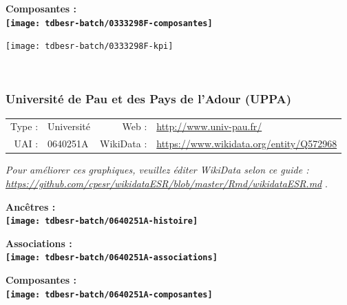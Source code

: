 \documentclass[12pt,french,]{article}
\begin{document}
\hrulefill

\begin{center} \bf Composantes : \\  
\texttt{[image: tdbesr-batch/0333298F-composantes]} \end{center}

\begin{center}\texttt{[image: tdbesr-batch/0333298F-kpi]} \end{center}\checkoddpage

\ifoddpage \fi ~\newpage  

\hypertarget{universituxe9-de-pau-et-des-pays-de-ladour-uppa}{%
\subsubsection{Université de Pau et des Pays de l'Adour
(UPPA)}\label{universituxe9-de-pau-et-des-pays-de-ladour-uppa}}

\begin{tabular*}{\textwidth}{rp{5cm}rl}  
\hline  
Type : & Université & Web : &\href{http://www.univ-pau.fr/}{http://www.univ-pau.fr/} \\  
UAI : & 0640251A & WikiData : & \href{https://www.wikidata.org/entity/Q572968}{https://www.wikidata.org/entity/Q572968} \\  
\hline  
\end{tabular*}

\textit{\scriptsize Pour améliorer ces graphiques, veuillez éditer WikiData selon ce guide :  \href{https://github.com/cpesr/wikidataESR/blob/master/Rmd/wikidataESR.md}{https://github.com/cpesr/wikidataESR/blob/master/Rmd/wikidataESR.md}}
.

\vspace{1cm}  
\begin{minipage}[b]{0.50\textwidth}\begin{center} \bf Ancêtres : \\  
\texttt{[image: tdbesr-batch/0640251A-histoire]} \end{center}\end{minipage}\begin{minipage}[b]{0.50\textwidth}\begin{center} \bf Associations : \\  
\texttt{[image: tdbesr-batch/0640251A-associations]} \end{center}\end{minipage}

\hrulefill

\begin{center} \bf Composantes : \\  
\texttt{[image: tdbesr-batch/0640251A-composantes]} \end{center}
\end{document}
